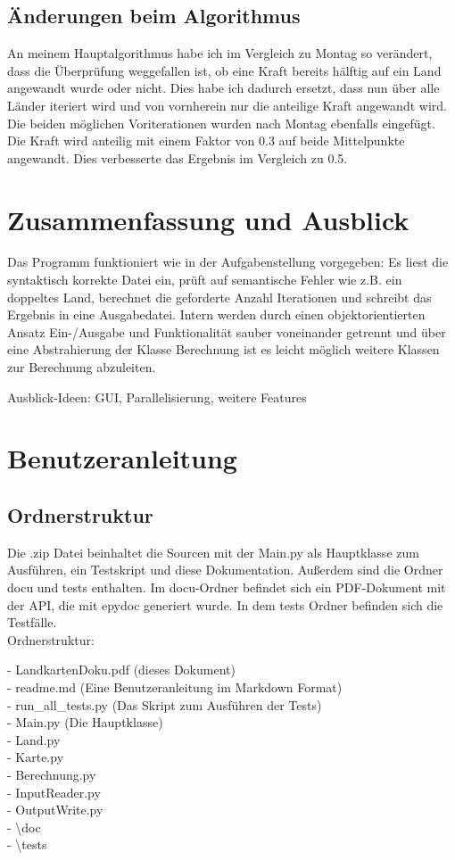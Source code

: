 \documentclass[a4paper,11pt]{article}
\newcommand*{\mybox}[2]{\colorbox{#1!30}{\parbox{.98\linewidth}{#2}}}
\begin{document}
{\subsection{\"Anderungen beim Algorithmus}
An meinem Hauptalgorithmus habe ich im Vergleich zu Montag so ver\"andert, dass die \"Uberpr\"ufung weggefallen ist, ob eine Kraft bereits h\"alftig auf ein Land angewandt wurde oder nicht.
Dies habe ich dadurch ersetzt, dass nun \"uber alle L\"ander iteriert wird und von vornherein nur die anteilige Kraft angewandt wird. Die beiden m\"oglichen Voriterationen wurden nach Montag ebenfalls eingef\"ugt.
Die Kraft wird anteilig mit einem Faktor von 0.3 auf beide Mittelpunkte angewandt. Dies verbesserte das Ergebnis im Vergleich zu 0.5.

\section{Zusammenfassung und Ausblick}
Das Programm funktioniert wie in der Aufgabenstellung vorgegeben: Es liest die syntaktisch korrekte Datei ein, pr\"uft auf semantische Fehler wie z.B. ein doppeltes Land, berechnet die geforderte Anzahl
Iterationen und schreibt das Ergebnis in eine Ausgabedatei. Intern werden durch einen objektorientierten Ansatz Ein-/Ausgabe und Funktionalit\"at sauber voneinander getrennt und \"uber eine Abstrahierung
der Klasse Berechnung ist es leicht m\"oglich weitere Klassen zur Berechnung abzuleiten.

Ausblick-Ideen: GUI, Parallelisierung, weitere Features


\section{Benutzeranleitung}
\subsection{Ordnerstruktur}
Die .zip Datei beinhaltet die Sourcen mit der Main.py als Hauptklasse zum Ausf\"uhren, ein Testskript und diese Dokumentation. Außerdem sind die Ordner \glqq docu\grqq{} und \glqq tests\grqq{} enthalten.
Im \glqq docu\grqq{}-Ordner befindet sich ein PDF-Dokument mit der API, die mit epydoc generiert wurde. In dem tests Ordner befinden sich die Testf\"alle.\\
\vspace{2mm}
Ordnerstruktur:\\
\mybox{background}{
	- LandkartenDoku.pdf (dieses Dokument)\\
	- readme.md (Eine Benutzeranleitung im Markdown Format)\\
	- run\_all\_tests.py (Das Skript zum Ausf\"uhren der Tests)\\
	- Main.py (Die Hauptklasse)\\
	- Land.py\\
	- Karte.py\\
	- Berechnung.py\\
	- InputReader.py\\
	- OutputWrite.py\\
	- \textbackslash doc\\
	- \textbackslash tests
}
}
\end{document}
